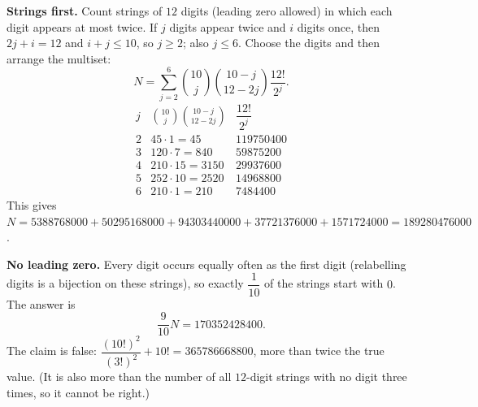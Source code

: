 \textbf{Strings first.} Count strings of $12$ digits (leading zero allowed) in which each digit appears at most twice. If $j$ digits appear twice and $i$ digits once, then $2j+i=12$ and $i+j\le10$, so $j\ge2$; also $j\le6$. Choose the digits and then arrange the multiset:
\[
N=\sum_{j=2}^{6}\binom{10}{j}\binom{10-j}{12-2j}\dfrac{12!}{2^j}.
\]
\[
\begin{array}{c|c|c}
j & \binom{10}j\binom{10-j}{12-2j} & \dfrac{12!}{2^j}\\\hline
2 & 45\cdot1=45 & 119750400\\
3 & 120\cdot7=840 & 59875200\\
4 & 210\cdot15=3150 & 29937600\\
5 & 252\cdot10=2520 & 14968800\\
6 & 210\cdot1=210 & 7484400
\end{array}
\]
This gives $N=5388768000+50295168000+94303440000+37721376000+1571724000=189280476000$.

\textbf{No leading zero.} Every digit occurs equally often as the first digit (relabelling digits is a bijection on these strings), so exactly $\dfrac{1}{10}$ of the strings start with $0$. The answer is
\[
\dfrac{9}{10}N=\boxed{170352428400}.
\]
The claim is false: $\dfrac{(10!)^2}{(3!)^2}+10!=365786668800$, more than twice the true value. (It is also more than the number of all $12$-digit strings with no digit three times, so it cannot be right.)
